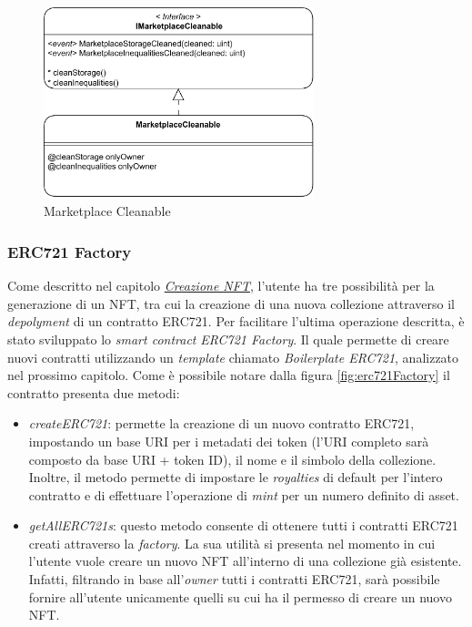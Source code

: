 \begin{figure}[H]
    \centering
    \includegraphics[width=0.7\textwidth]{images/blockchainContracts/MarketplaceCleanable.png}
    \caption{Marketplace Cleanable}
    \label{fig:marketplaceCleanable}
\end{figure}


\subsubsection{ERC721 Factory}

Come descritto nel capitolo \hyperref[sec:creazioneNFT]{\textit{Creazione NFT}}, l'utente ha tre possibilità per la generazione di un NFT, tra cui la creazione di una nuova collezione attraverso il \textit{depolyment} di un contratto ERC721. Per facilitare l'ultima operazione descritta, è stato sviluppato lo \textit{smart contract} \textit{ERC721 Factory}. Il quale permette di creare nuovi contratti utilizzando un \textit{template} chiamato \textit{Boilerplate ERC721}, analizzato nel prossimo capitolo. Come è possibile notare dalla figura \ref{fig:erc721Factory} il contratto presenta due metodi:

\begin{itemize}
    \item \textit{createERC721}: permette la creazione di un nuovo contratto ERC721, impostando un base URI per i metadati dei token (l'URI completo sarà composto da base URI + token ID), il nome e il simbolo della collezione. Inoltre, il metodo permette di impostare le \textit{royalties} di default per l'intero contratto e di effettuare l'operazione di \textit{mint} per un numero definito di asset.
    \item \textit{getAllERC721s}: questo metodo consente di ottenere tutti i contratti ERC721 creati attraverso la \textit{factory}. La sua utilità si presenta nel momento in cui l'utente vuole creare un nuovo NFT all'interno di una collezione già esistente. Infatti, filtrando in base all'\textit{owner} tutti i contratti ERC721, sarà possibile fornire all'utente unicamente quelli su cui ha il permesso di creare un nuovo NFT.
\end{itemize}

